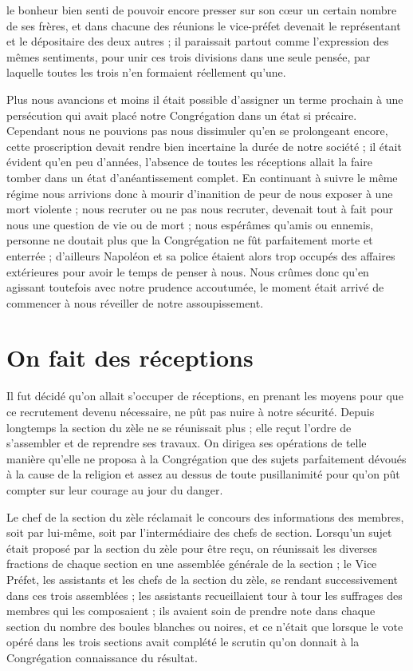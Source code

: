 le bonheur bien senti de pouvoir encore presser sur son cœur un certain nombre de ses frères, et dans chacune des réunions le vice-préfet devenait le représentant et le dépositaire des deux autres ; il paraissait partout comme l'expression des mêmes sentiments, pour unir ces trois divisions dans une seule pensée, par laquelle toutes les trois n'en formaient réellement qu'une.

Plus nous avancions et moins il était possible d'assigner un terme prochain à une persécution qui avait placé notre Congrégation dans un état si précaire. Cependant nous ne pouvions pas nous dissimuler qu'en se prolongeant encore, cette proscription devait rendre bien incertaine la durée de notre société ; il était évident qu'en peu d'années, l'absence de toutes les réceptions allait la faire tomber dans un état d'anéantissement complet. En continuant à suivre le même régime nous arrivions donc à mourir d'inanition de peur de nous exposer à une mort violente ; nous recruter ou ne pas nous recruter, devenait tout à fait pour nous une question de vie ou de mort ; nous espérâmes qu'amis ou ennemis, personne ne doutait plus que la Congrégation ne fût parfaitement morte et enterrée ; d'ailleurs Napoléon et sa police étaient alors trop occupés des affaires extérieures pour avoir le temps de penser à nous. Nous crûmes donc qu'en agissant toutefois avec notre prudence accoutumée, le moment était arrivé de commencer à nous réveiller de notre assoupissement.

\section*{On fait des réceptions}
Il fut décidé qu'on allait s'occuper de réceptions, en prenant les moyens pour que ce recrutement devenu nécessaire, ne pût pas nuire à notre sécurité. Depuis longtemps la section du zèle ne se réunissait plus ; elle reçut l'ordre de s'assembler et de reprendre ses travaux. On dirigea ses opérations de telle manière qu'elle ne proposa à la Congrégation que des sujets parfaitement dévoués à la cause de la
religion et assez au dessus de toute pusillanimité pour qu'on pût compter sur leur courage au jour du danger.

Le chef de la section du zèle réclamait le concours des informations des membres, soit par lui-même, soit par l'intermédiaire des chefs de section. Lorsqu'un sujet était proposé par la section du zèle pour être reçu, on réunissait les diverses fractions de chaque section en une assemblée générale de la section ; le Vice Préfet, les assistants et les chefs de la section du zèle, se rendant successivement dans ces trois assemblées ; les assistants recueillaient tour à tour les suffrages des membres qui les composaient ; ils avaient soin de prendre note dans chaque section du nombre des boules blanches ou noires, et ce n'était que lorsque le vote opéré dans les trois sections avait complété le scrutin qu'on donnait à la Congrégation connaissance du résultat.

